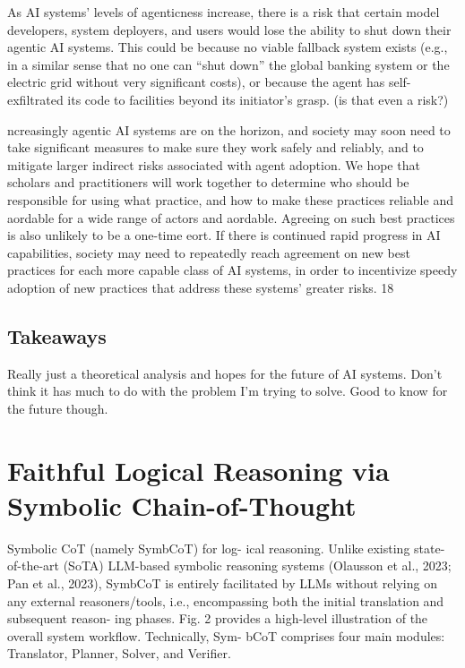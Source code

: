 \documentclass[10pt,a4paper]{article}
\begin{document}
\begin{multicols}{2}
As AI systems’ levels of agenticness increase, there is a risk that certain model developers, system
deployers, and users would lose the ability to shut down their agentic AI systems. This could be
because no viable fallback system exists (e.g., in a similar sense that no one can “shut down” the
global banking system or the electric grid without very significant costs), or because the agent has
self-exfiltrated its code to facilities beyond its initiator’s grasp. (is that even a risk?)

ncreasingly agentic AI systems are on the horizon, and society may soon need to take significant
measures to make sure they work safely and reliably, and to mitigate larger indirect risks associated
with agent adoption. We hope that scholars and practitioners will work together to determine
who should be responsible for using what practice, and how to make these practices reliable and
aordable for a wide range of actors and aordable. Agreeing on such best practices is also unlikely
to be a one-time eort. If there is continued rapid progress in AI capabilities, society may need to
repeatedly reach agreement on new best practices for each more capable class of AI systems, in
order to incentivize speedy adoption of new practices that address these systems’ greater risks.
18

\subsection*{Takeaways}

Really just a theoretical analysis and hopes for the future of AI systems. Don't think it has much to do with the problem I'm trying to solve. Good to know for the future though.

\section*{Faithful Logical Reasoning via Symbolic Chain-of-Thought}

Symbolic CoT (namely SymbCoT) for log-
ical reasoning. Unlike existing state-of-the-art
(SoTA) LLM-based symbolic reasoning systems
(Olausson et al., 2023; Pan et al., 2023), SymbCoT
is entirely facilitated by LLMs without relying on
any external reasoners/tools, i.e., encompassing
both the initial translation and subsequent reason-
ing phases. Fig. 2 provides a high-level illustration
of the overall system workflow. Technically, Sym-
bCoT comprises four main modules: Translator,
Planner, Solver, and Verifier.


\end{multicols}
\end{document}

